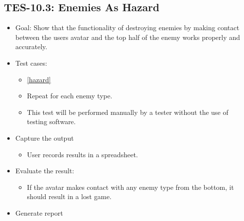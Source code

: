 \subsection{TES-10.3: Enemies As Hazard }
\begin{itemize}
\item Goal: Show that the functionality of destroying enemies by making contact between
the users avatar and the top half of the enemy works properly and accurately.
\item Test cases: 

\begin{itemize}
\item \ref{hazard}
\item Repeat for each enemy type.
\item This test will be performed manually by a tester without the use of testing software.
\end{itemize}
\item Capture the output 
\begin{itemize}
\item User records results in a spreadsheet.
\end{itemize}
\item Evaluate the result: 

\begin{itemize}
\item If the avatar makes contact with any enemy type from the bottom, it should result in a lost game. 
\end{itemize}
\item Generate report 
\end{itemize}

